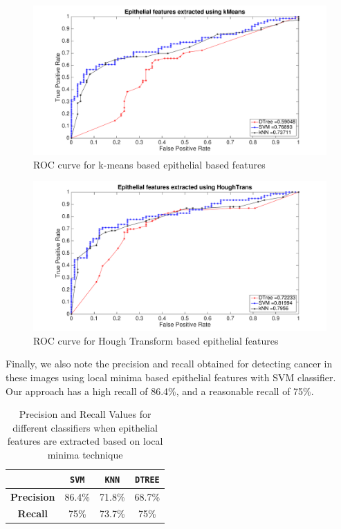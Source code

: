 \begin{figure}
\includegraphics[scale=0.2]{figs/ROC_kMeans.pdf}
\caption{\label{fig:ROC_kMeans}ROC curve for k-means based epithelial based features}
\end{figure}


\begin{figure}
\includegraphics[scale=0.2]{figs/ROC_circleConv.pdf}
\caption{\label{fig:ROC_circleConv}ROC curve for Hough Transform based  epithelial features}
\end{figure} 



Finally, we also note the precision and recall obtained for detecting cancer in these images using local minima based epithelial features with SVM classifier. Our approach has a high recall of 86.4\%, and a reasonable recall of 75\%.

\begin{table}
\centering
\begin{tabular}{|c|c|c|c| }
\hline
 & \textbf{\texttt{SVM}} & \textbf{\texttt{KNN}} & \textbf{\texttt{DTREE}} \\ \hline
\textbf{Precision} & 86.4\% & 71.8\% & 68.7\% \\ \hline
\textbf{Recall} & 75\% & 73.7\%  & 75\% \\ \hline
\end{tabular}
\caption{\label{table:PrecisionRecall}Precision and Recall Values for different classifiers when epithelial features are extracted based on local minima technique}
\end{table}